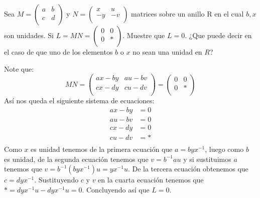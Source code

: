 
\usepackage{amsmath}
\usepackage{geometry}
\usepackage{tikz}
\usepackage{float}
\usepackage{graphics}



\maketitle
\thispagestyle{empty}
\newpage 

\begin{homeworkProblem}
    Sea $M=\begin{pmatrix}
       a&b\\
       c&d\\
   \end{pmatrix}$ y $N=\begin{pmatrix}
       x&u\\
       -y&-v\\
   \end{pmatrix}$ matrices sobre un anillo R en el cual $b,x$ son unidades. Si $L=MN=\begin{pmatrix}
       0&0\\
       0&*\\
   \end{pmatrix}$. Muestre que $L=0$. ¿Que puede decir en el caso de que uno de los elementos $b$ o $x$ no sean una unidad en $R$?
   \begin{solucion}
       Note que:
       $$MN=\begin{pmatrix}
           ax-by&au-bv\\
           cx-dy&cu-dv\\
       \end{pmatrix}=\begin{pmatrix}
           0&0\\
           0&*\\
       \end{pmatrix}$$
       Así nos queda el siguiente sistema de ecuaciones:
       \begin{align*}
           ax-by&=0\\
           au-bv&=0\\
           cx-dy&=0\\
           cu-dv&=*\\
       \end{align*}
       Como $x$ es unidad tenemos de la primera ecuación que $a=byx^{-1}$, luego como $b$ es unidad, de la segunda ecuación tenemos que $v=b^{-1}au$ y si sustituimos $a$ tenemos que $v=b^{-1}(byx^{-1})u=yx^{-1}u$. De la tercera ecuación obtenemos que $c=dyx^{-1}$. Sustituyendo $c$ y $v$ en la cuarta ecuación tenemos que $*=dyx^{-1}u-dyx^{-1}u=0$. Concluyendo así que $L=0.$\\


\end{solucion}
\end{homeworkProblem}
